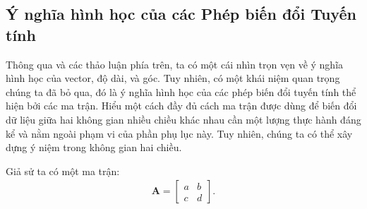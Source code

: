 \documentclass[letterpaper,11pt,english]{sphinxmanual}
\begin{document}
\subsection{Ý nghĩa hình học của các Phép biến đổi Tuyến tính}
\label{\detokenize{chapter_appendix_math/geometry-linear-algebric-ops_vn:y-nghia-hinh-hoc-cua-cac-phep-bien-doi-tuyen-tinh}}


Thông qua  và các thảo luận phía trên, ta
có một cái nhìn trọn vẹn về ý nghĩa hình học của vector, độ dài, và góc.
Tuy nhiên, có một khái niệm quan trọng chúng ta đã bỏ qua, đó là ý nghĩa
hình học của các phép biến đổi tuyến tính thể hiện bởi các ma trận. Hiểu
một cách đầy đủ cách ma trận được dùng để biến đổi dữ liệu giữa hai
không gian nhiều chiều khác nhau cần một lượng thực hành đáng kể và nằm
ngoài phạm vi của phần phụ lục này. Tuy nhiên, chúng ta có thể xây dựng
ý niệm trong không gian hai chiều.



Giả sử ta có một ma trận:
\begin{equation}\label{equation:chapter_appendix_math/geometry-linear-algebric-ops_vn:chapter_appendix_math/geometry-linear-algebric-ops_vn:8}
\begin{split}\mathbf{A} = \begin{bmatrix}
a & b \\ c & d
\end{bmatrix}.\end{split}
\end{equation}
\end{document}
